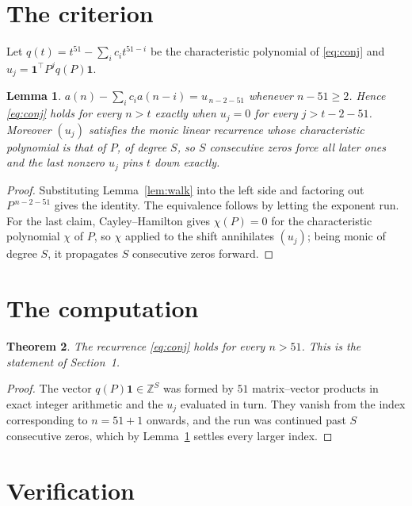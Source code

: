 \documentclass[11pt,a4paper]{article}
\theoremstyle{plain}
\newtheorem{theorem}{Theorem}
\newtheorem{lemma}[theorem]{Lemma}
\theoremstyle{definition}
\begin{document}
\section{The criterion}

Let $q(t)=t^{51}-\sum_i c_i t^{51-i}$ be the characteristic polynomial of
\eqref{eq:conj} and $u_j=\mathbf{1}^{\!\top}P^{j}q(P)\mathbf{1}$.

\begin{lemma}\label{lem:crit}
$a(n)-\sum_i c_i a(n-i)=u_{\,n-2-51}$ whenever $n-51\ge2$. Hence
\eqref{eq:conj} holds for every $n>t$ exactly when $u_j=0$ for every
$j>t-2-51$. Moreover $(u_j)$ satisfies the monic linear recurrence whose
characteristic polynomial is that of $P$, of degree $S$, so $S$ consecutive zeros force all
later ones and the last nonzero $u_j$ pins $t$ down exactly.
\end{lemma}

\begin{proof}
Substituting Lemma~\ref{lem:walk} into the left side and factoring out
$P^{\,n-2-51}$ gives the identity. The equivalence follows by letting the exponent
run. For the last claim, Cayley--Hamilton gives $\chi(P)=0$ for the characteristic
polynomial $\chi$ of $P$, so $\chi$ applied to the shift annihilates $(u_j)$; being monic of
degree $S$, it propagates $S$ consecutive zeros forward.
\end{proof}

\section{The computation}

\begin{theorem}
The recurrence \eqref{eq:conj} holds for every $n>51$. This is the statement of
Section~1.
\end{theorem}

\begin{proof}
The vector $q(P)\mathbf{1}\in\mathbb{Z}^{S}$ was formed by $51$ matrix--vector
products in exact integer arithmetic and the $u_j$ evaluated in turn. They vanish from the
index corresponding to $n=51+1$ onwards, and the run was continued past $S$ consecutive
zeros, which by Lemma~\ref{lem:crit} settles every larger index.
\end{proof}

\section{Verification}
\end{document}
